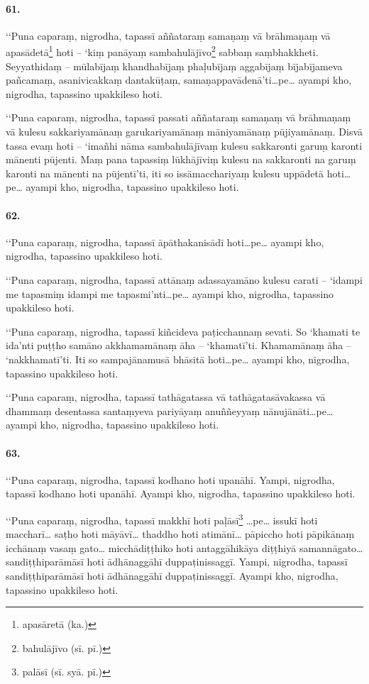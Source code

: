 \paragraph{61.} ‘‘Puna caparaṃ, nigrodha, tapassī aññataraṃ samaṇaṃ vā brāhmaṇaṃ vā apasādetā\footnote{apasāretā (ka.)} hoti – ‘kiṃ panāyaṃ sambahulājīvo\footnote{bahulājīvo (sī. pī.)} sabbaṃ saṃbhakkheti. Seyyathidaṃ – mūlabījaṃ khandhabījaṃ phaḷubījaṃ aggabījaṃ bījabījameva pañcamaṃ, asanivicakkaṃ dantakūṭaṃ, samaṇappavādenā’ti…pe… ayampi kho, nigrodha, tapassino upakkileso hoti.

‘‘Puna caparaṃ, nigrodha, tapassī passati aññataraṃ samaṇaṃ vā brāhmaṇaṃ vā kulesu sakkariyamānaṃ garukariyamānaṃ māniyamānaṃ pūjiyamānaṃ. Disvā tassa evaṃ hoti – ‘imañhi nāma sambahulājīvaṃ kulesu sakkaronti garuṃ karonti mānenti pūjenti. Maṃ pana tapassiṃ lūkhājīviṃ kulesu na sakkaronti na garuṃ karonti na mānenti na pūjentī’ti, iti so issāmacchariyaṃ kulesu uppādetā hoti…pe… ayampi kho, nigrodha, tapassino upakkileso hoti.

\paragraph{62.} ‘‘Puna caparaṃ, nigrodha, tapassī āpāthakanisādī hoti…pe… ayampi kho, nigrodha, tapassino upakkileso hoti.

‘‘Puna caparaṃ, nigrodha, tapassī attānaṃ adassayamāno kulesu carati – ‘idampi me tapasmiṃ idampi me tapasmi’nti…pe… ayampi kho, nigrodha, tapassino upakkileso hoti.

‘‘Puna caparaṃ, nigrodha, tapassī kiñcideva paṭicchannaṃ sevati. So ‘khamati te ida’nti puṭṭho samāno akkhamamānaṃ āha – ‘khamatī’ti. Khamamānaṃ āha – ‘nakkhamatī’ti. Iti so sampajānamusā bhāsitā hoti…pe… ayampi kho, nigrodha, tapassino upakkileso hoti.

‘‘Puna caparaṃ, nigrodha, tapassī tathāgatassa vā tathāgatasāvakassa vā dhammaṃ desentassa santaṃyeva pariyāyaṃ anuññeyyaṃ nānujānāti…pe… ayampi kho, nigrodha, tapassino upakkileso hoti.

\paragraph{63.} ‘‘Puna caparaṃ, nigrodha, tapassī kodhano hoti upanāhī. Yampi, nigrodha, tapassī kodhano hoti upanāhī. Ayampi kho, nigrodha, tapassino upakkileso hoti.

‘‘Puna caparaṃ, nigrodha, tapassī makkhī hoti paḷāsī\footnote{palāsī (sī. syā. pī.)} …pe… issukī hoti maccharī… saṭho hoti māyāvī… thaddho hoti atimānī… pāpiccho hoti pāpikānaṃ icchānaṃ vasaṃ gato… micchādiṭṭhiko hoti antaggāhikāya diṭṭhiyā samannāgato… sandiṭṭhiparāmāsī hoti ādhānaggāhī duppaṭinissaggī. Yampi, nigrodha, tapassī sandiṭṭhiparāmāsī hoti ādhānaggāhī duppaṭinissaggī. Ayampi kho, nigrodha, tapassino upakkileso hoti.

